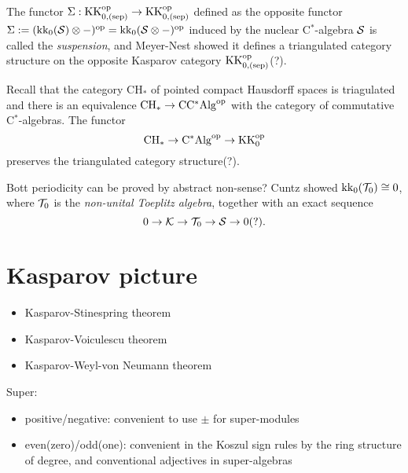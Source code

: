 \documentclass{../../large}
\begin{document}
\begin{prb}
The functor $\Sigma:\mathrm{KK}_{0,(\mathrm{sep})}^{\mathrm{op}}\to\mathrm{KK}_{0,(\mathrm{sep})}^{\mathrm{op}}$ defined as the opposite functor $\Sigma:=(\mathrm{kk}_0(\mathcal{S})\otimes-)^{\mathrm{op}}=\mathrm{kk}_0(\mathcal{S}\otimes-)^{\mathrm{op}}$ induced by the nuclear C$^*$-algebra $\mathcal{S}$ is called the \emph{suspension}, and Meyer-Nest showed it defines a triangulated category structure on the opposite Kasparov category $\mathrm{KK}_{0,(\mathrm{sep})}^{\mathrm{op}}$(?).

Recall that the category $\mathrm{CH}_*$ of pointed compact Hausdorff spaces is triagulated and there is an equivalence $\mathrm{CH}_*\to\mathrm{CC^*Alg}^{\mathrm{op}}$ with the category of commutative C$^*$-algebras.
The functor
\[\mathrm{CH}_*\to\mathrm{C^*Alg}^{\mathrm{op}}\to\mathrm{KK}_0^{\mathrm{op}}\]
preserves the triangulated category structure(?).
\end{prb}

Bott periodicity can be proved by abstract non-sense?
Cuntz showed $\mathrm{kk}_0(\mathcal{T}_0)\cong0$, where $\mathcal{T}_0$ is the \emph{non-unital Toeplitz algebra}, together with an exact sequence
\[0\to\mathcal{K}\to\mathcal{T}_0\to\mathcal{S}\to0(?).\]

\section{Kasparov picture}



\begin{itemize}
\item Kasparov-Stinespring theorem
\item Kasparov-Voiculescu theorem
\item Kasparov-Weyl-von Neumann theorem
\end{itemize}

Super:
\begin{itemize}
\item positive/negative: convenient to use $\pm$ for super-modules
\item even(zero)/odd(one): convenient in the Koszul sign rules by the ring structure of degree, and conventional adjectives in super-algebras
\end{itemize}
\end{document}

